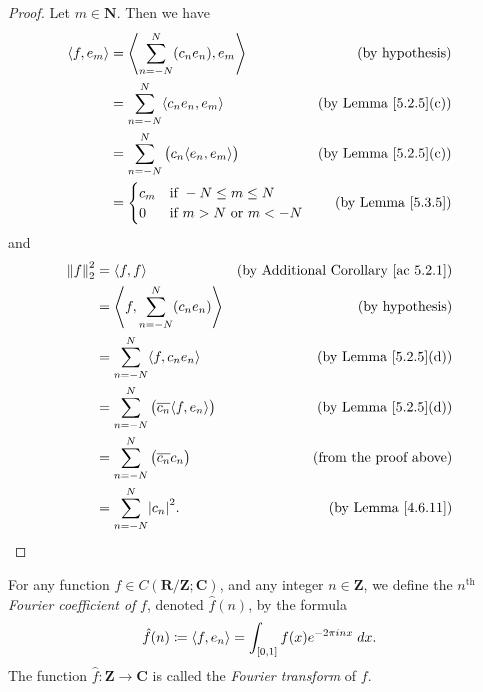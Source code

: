 \begin{proof}
    Let \(m \in \mathbf{N}\).
    Then we have
    \begin{align*}
        \inner*{f, e_m} & = \inner*{\sum_{n = -N}^N (c_n e_n), e_m}         & \text{(by hypothesis)}           \\
                        & = \sum_{n = -N}^N \inner*{c_n e_n, e_m}           & \text{(by Lemma \ref{5.2.5}(c))} \\
                        & = \sum_{n = -N}^N \big(c_n \inner*{e_n, e_m}\big) & \text{(by Lemma \ref{5.2.5}(c))} \\
                        & = \begin{cases}
            c_m & \text{if } -N \leq m \leq N         \\
            0   & \text{if } m > N \text{ or } m < -N
        \end{cases}                      & \text{(by Lemma \ref{5.3.5})}
    \end{align*}
    and
    \begin{align*}
        \norm*{f}_2^2 & = \inner*{f, f}                                            & \text{(by Additional Corollary \ref{ac 5.2.1})} \\
                      & = \inner*{f, \sum_{n = -N}^N (c_n e_n)}                    & \text{(by hypothesis)}                          \\
                      & = \sum_{n = -N}^N \inner*{f, c_n e_n}                      & \text{(by Lemma \ref{5.2.5}(d))}                \\
                      & = \sum_{n = -N}^N \big(\overline{c_n} \inner*{f, e_n}\big) & \text{(by Lemma \ref{5.2.5}(d))}                \\
                      & = \sum_{n = -N}^N \big(\overline{c_n} c_n\big)             & \text{(from the proof above)}                   \\
                      & = \sum_{n = -N}^N \abs*{c_n}^2.                            & \text{(by Lemma \ref{4.6.11})}
    \end{align*}
\end{proof}

\begin{definition}\label{5.3.7}
    For any function \(f \in C(\mathbf{R} / \mathbf{Z} ; \mathbf{C})\), and any integer \(n \in \mathbf{Z}\), we define the \(n^{\text{th}}\) \emph{Fourier coefficient of} \(f\), denoted \(\hat{f}(n)\), by the formula
    \[
        \hat{f}(n) \coloneqq \inner*{f, e_n} = \int_{[0, 1]} f(x) e^{- 2 \pi i n x} \; dx.
    \]
    The function \(\hat{f} : \mathbf{Z} \to \mathbf{C}\) is called the \emph{Fourier transform} of \(f\).
\end{definition}

